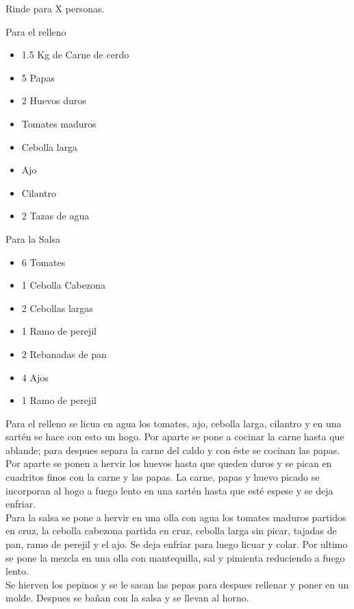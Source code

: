 
Rinde para X personas.\\

\begin{ingredientes}
\item Para el relleno
\begin{itemize}
\item 1.5 Kg de Carne de cerdo
\item 5 Papas
\item 2 Huevos duros
\item Tomates maduros
\item Cebolla larga
\item Ajo
\item Cilantro
\item 2 Tazas de agua
\end{itemize}
\item Para la Salsa
\begin{itemize}
\item 6 Tomates
\item 1 Cebolla Cabezona
\item 2 Cebollas largas
\item 1 Ramo de perejil
\item 2 Rebanadas de pan
\item 4 Ajos
\item 1 Ramo de perejil
\end{itemize}
\end{ingredientes}
\preparacion

Para el relleno se licua en agua los tomates, ajo, cebolla larga, cilantro y en una sartén se hace con esto un hogo. Por aparte se pone a cocinar la carne hasta que ablande; para despues separa la carne del caldo y con éste se cocinan 
las papas. Por aparte se ponen a hervir los huevos hasta que queden duros y se pican en cuadritos finos con la carne y las papas. La carne, papas y huevo picado se incorporan al hogo a fuego lento en una sartén hasta que esté espese y se deja enfriar.\\

Para la salsa se pone a hervir en una olla con agua los tomates maduros partidos en cruz, la cebolla cabezona partida en cruz, cebolla larga sin picar, tajadas de pan, ramo de perejil y el ajo. Se deja enfriar para luego licuar y colar. Por ultimo se pone la mezcla en una olla con mantequilla, sal y pimienta reduciendo a fuego lento.\\

Se hierven los pepinos y se le sacan las pepas para despues rellenar y poner en un molde. Despues se bañan con la salsa y se llevan al horno.